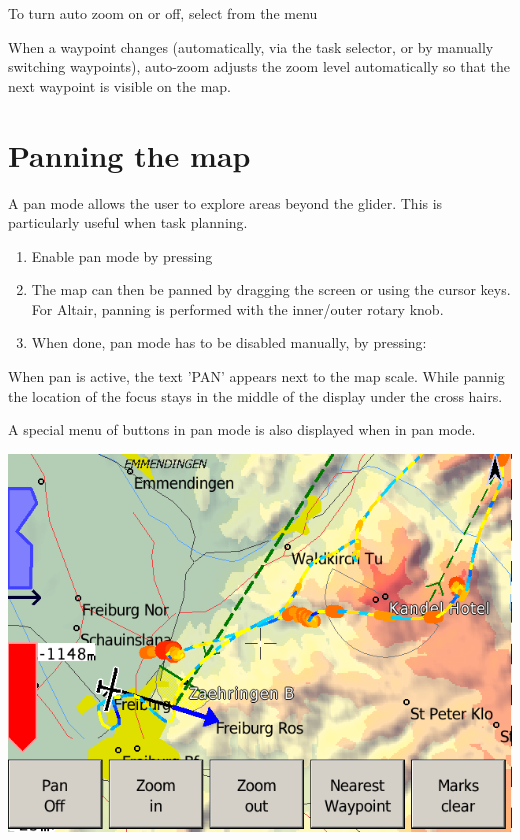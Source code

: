 \documentclass[a4paper,12pt]{refrep}
\begin{document}
To turn auto zoom on or off, select from the menu
\begin{quote}
\blink{}\blink{} 
\end{quote}

When a waypoint changes (automatically, via the task selector, or by
manually switching waypoints), auto-zoom adjusts the zoom level
automatically so that the next waypoint is visible on the map.


\section{Panning the map}

A pan mode allows the user to explore areas beyond the glider.  This
is particularly useful when task planning.
\begin{enumerate}
\item Enable pan mode by pressing 
\begin{quote}
\blink{}
\end{quote}

\item The map can then be panned by dragging the screen or using the cursor
  keys.  For Altair, panning is performed with the inner/outer rotary knob.
\item When done, pan mode has to be disabled manually, by pressing:
\begin{quote}
\end{quote}

\end{enumerate} 

When pan is active, the text 'PAN' appears next to the map scale.  While
pannig the location of the focus stays in the middle of the display under the
cross hairs.

A special menu of buttons in pan mode is also displayed when in pan
mode.

\begin{center}
\includegraphics[angle=0,width=0.8\linewidth,keepaspectratio='true']{figures/pan.png}
\end{center}
\end{document}
